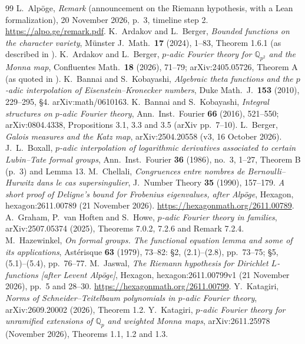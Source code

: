 \documentclass[11pt]{amsart}
\theoremstyle{definition}
\theoremstyle{remark}
\newcommand{\Q}{\mathbb Q}
\begin{document}
\begin{thebibliography}{99}
 L.~Alp\"oge, \emph{Remark} (announcement on the Riemann hypothesis, with a Lean formalization), 20 November 2026, p.~3, timeline step 2. \url{https://alpo.ge/remark.pdf}.
 K.~Ardakov and L.~Berger, \emph{Bounded functions on the character variety}, M\"unster J.\ Math.\ \textbf{17} (2024), 1--83, Theorem 1.6.1 (as described in \cite[Introduction]{Berger25}).
 K.~Ardakov and L.~Berger, \emph{$p$-adic Fourier theory for $\Q_{p^2}$ and the Monna map}, Confluentes Math.\ \textbf{18} (2026), 71--79; arXiv:2405.05726, Theorem A (as quoted in \cite[Theorem 1.1]{Katagiri26b}).
 K.~Bannai and S.~Kobayashi, \emph{Algebraic theta functions and the $p$-adic interpolation of Eisenstein--Kronecker numbers}, Duke Math.\ J.\ \textbf{153} (2010), 229--295, \S4. arXiv:math/0610163.
 K.~Bannai and S.~Kobayashi, \emph{Integral structures on $p$-adic Fourier theory}, Ann.\ Inst.\ Fourier \textbf{66} (2016), 521--550; arXiv:0804.4338, Propositions 3.1, 3.3 and 3.5 (arXiv pp.~7--10).
 L.~Berger, \emph{Galois measures and the Katz map}, arXiv:2504.20558 (v3, 16 October 2026).
 J.~L.~Boxall, \emph{$p$-adic interpolation of logarithmic derivatives associated to certain Lubin--Tate formal groups}, Ann.\ Inst.\ Fourier \textbf{36} (1986), no.~3, 1--27, Theorem B (p.~3) and Lemma 13.
 M.~Chellali, \emph{Congruences entre nombres de Bernoulli--Hurwitz dans le cas supersingulier}, J.\ Number Theory \textbf{35} (1990), 157--179.
 \emph{A short proof of Deligne's bound for Frobenius eigenvalues, after Alp\"oge}, Hexagon, hexagon:2611.00789 (21 November 2026). \url{https://hexagonmath.org/2611.00789}.
 A.~Graham, P.~van Hoften and S.~Howe, \emph{$p$-adic Fourier theory in families}, arXiv:2507.05374 (2025), Theorems 7.0.2, 7.2.6 and Remark 7.2.4.
 M.~Hazewinkel, \emph{On formal groups. The functional equation lemma and some of its applications}, Ast\'erisque \textbf{63} (1979), 73--82: \S2, (2.1)--(2.8), pp.~73--75; \S5, (5.1)--(5.4), pp.~76--77.
 M.~Jaswal, \emph{The Riemann hypothesis for Dirichlet $L$-functions [after Levent Alp\"oge]}, Hexagon, hexagon:2611.00799v1 (21 November 2026), pp.~5 and 28--30. \url{https://hexagonmath.org/2611.00799}.
 Y.~Katagiri, \emph{Norms of Schneider--Teitelbaum polynomials in $p$-adic Fourier theory}, arXiv:2609.20002 (2026), Theorem 1.2.
 Y.~Katagiri, \emph{$p$-adic Fourier theory for unramified extensions of $\Q_p$ and weighted Monna maps}, arXiv:2611.25978 (November 2026), Theorems 1.1, 1.2 and 1.3.

\end{thebibliography}
\end{document}
